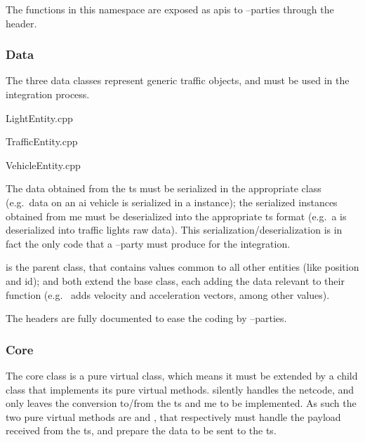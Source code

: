 The functions in this namespace are exposed as \glspl{api} to --parties through the  header.

\subsubsection{Data}

The three data classes represent generic traffic objects, and must be used in the integration process.

\begin{filelist}
	\item LightEntity.cpp
	\item TrafficEntity.cpp
	\item VehicleEntity.cpp
\end{filelist}

The data obtained from the \gls{ts} must be serialized in the appropriate class (e.g.\ data on an \gls{ai} vehicle is serialized in a  instance); the serialized instances obtained from \gls{me} must be deserialized into the appropriate \gls{ts} format (e.g.\ a  is deserialized into traffic lights raw data). This serialization/deserialization is in fact the only code that a --party must produce for the integration.

 is the parent class, that contains values common to all other entities (like position and id);  and  both extend the base class, each adding the data relevant to their function (e.g.\  adds velocity and acceleration vectors, among other values).

The headers are fully documented to ease the coding by --parties.

\subsubsection{Core}

The core class is a pure virtual class, which means it must be extended by a child class that implements its pure virtual methods.  silently handles the netcode, and only leaves the conversion to/from the \gls{ts} and \gls{me} to be implemented. As such the two pure virtual methods are  and , that respectively must handle the \gls{payload} received from the \gls{ts}, and prepare the data to be sent to the \gls{ts}.

